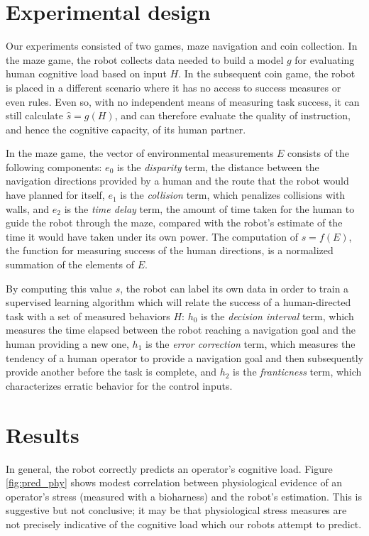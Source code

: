 \documentclass{sig-alternate}
\begin{document}
\section{Experimental design} 
Our experiments consisted of two games, maze navigation
\cite{crick2011human} and coin collection. In the maze game, the robot
collects data needed to build a model $g$ for evaluating human
cognitive load based on input $H$. In the subsequent coin game, the
robot is placed in a different scenario where it has no access to
success measures or even rules.  Even so, with no independent means of
measuring task success, it can still calculate $\hat{s}=g(H)$, and can
therefore evaluate the quality of instruction, and hence the cognitive
capacity, of its human partner.

In the maze game, the vector of environmental measurements $E$
consists of the following components: $e_0$ is the \emph{disparity}
term, the distance between the navigation directions provided by a
human and the route that the robot would have planned for itself,
$e_1$ is the \emph{collision} term, which penalizes collisions with
walls, and $e_2$ is the \emph{time delay} term, the amount of time
taken for the human to guide the robot through the maze, compared with
the robot's estimate of the time it would have taken under its own
power. The computation of $s = f(E)$, the function for measuring
success of the human directions, is a normalized summation of the
elements of $E$.

By computing this value $s$, the robot can label its own data in order
to train a supervised learning algorithm which will relate the success
of a human-directed task with a set of measured behaviors $H$: $h_0$
is the \emph{decision interval} term, which measures the time elapsed
between the robot reaching a navigation goal and the human providing a
new one, $h_1$ is the \emph{error correction} term, which measures the
tendency of a human operator to provide a navigation goal and then
subsequently provide another before the task is complete, and $h_2$
is the \emph{franticness} term, which characterizes erratic behavior
for the control inputs.

\section{Results}
In general, the robot correctly predicts an operator's cognitive load.
Figure \ref{fig:pred_phy} shows modest correlation between
physiological evidence of an operator's stress (measured with a
bioharness) and the robot's estimation.  This is suggestive but not
conclusive; it may be that physiological stress measures are not
precisely indicative of the cognitive load which our robots attempt to
predict.
\end{document}
